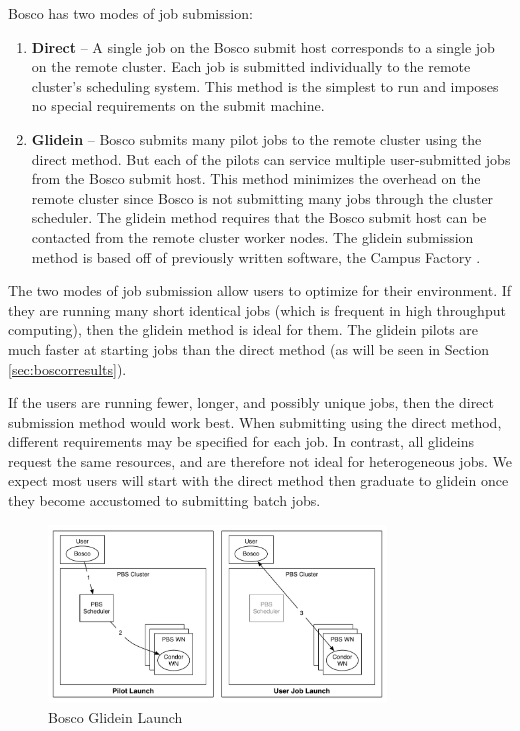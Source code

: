 Bosco has two modes of job submission:
\begin{enumerate}
	\item \textbf{Direct} -- A single job on the Bosco submit host corresponds to a single job on the remote cluster.  Each job is submitted individually to the remote cluster's scheduling system.  This method is the simplest to run and imposes no special requirements on the submit machine.
	
	\item \textbf{Glidein} -- Bosco submits many pilot jobs to the remote cluster using the direct method.  But each of the pilots can service multiple user-submitted jobs from the Bosco submit host.  This method minimizes the overhead on the remote cluster since Bosco is not submitting many jobs through the cluster scheduler.  The glidein method requires that the Bosco submit host can be contacted from the remote cluster worker nodes. \label{sec:glidein}  The glidein submission method is based off of previously written software, the Campus Factory \cite{weitzel2011campus}.
\end{enumerate}

The two modes of job submission allow users to optimize for their environment.  If they are running many short identical jobs (which is frequent in high throughput computing), then the glidein method is ideal for them.  The glidein pilots are much faster at starting jobs than the direct method (as will be seen in Section \ref{sec:boscorresults}).

If the users are running fewer, longer, and possibly unique  jobs, then the direct submission method would work best.  When submitting using the direct method, different requirements may be specified for each job.  In contrast, all glideins request the same resources, and are therefore not ideal for heterogeneous jobs.  We expect most users will start with the direct method then graduate to glidein once they become accustomed to submitting batch jobs.

\begin{figure}[h!t]
	\centering
	\includegraphics[width=0.8\textwidth]{images/BoscoGlideinLaunch.pdf}
	\caption{Bosco Glidein Launch}
	\label{fig:boscoglideinlaunch}
\end{figure}

